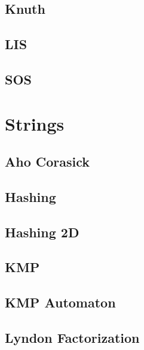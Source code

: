 \subsection{Knuth}
\raggedbottom
\hrulefill
\subsection{LIS}
\raggedbottom
\hrulefill
\subsection{SOS}
\raggedbottom
\hrulefill

\section{Strings}
\subsection{Aho Corasick}
\raggedbottom
\hrulefill
\subsection{Hashing}
\raggedbottom
\hrulefill
\subsection{Hashing 2D}
\raggedbottom
\hrulefill
\subsection{KMP}
\raggedbottom
\hrulefill
\subsection{KMP Automaton}
\raggedbottom
\hrulefill
\subsection{Lyndon Factorization}
\raggedbottom
\hrulefill
